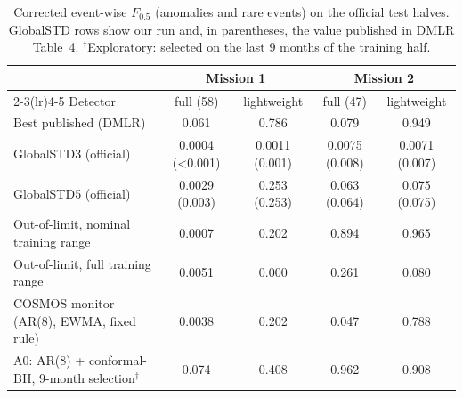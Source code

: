 \begin{table}[t]\centering\small
\caption{Corrected event-wise $F_{0.5}$ (anomalies and rare events) on the official test halves. GlobalSTD rows show our run and, in parentheses, the value published in DMLR Table~4. $^\dagger$Exploratory: selected on the last 9 months of the training half.}\label{tab:baselines}
\begin{tabular}{lcccc}\toprule
 & \multicolumn{2}{c}{Mission 1} & \multicolumn{2}{c}{Mission 2}\\
\cmidrule(lr){2-3}\cmidrule(lr){4-5}
Detector & full (58) & lightweight & full (47) & lightweight\\\midrule
Best published (DMLR) & 0.061 & 0.786 & 0.079 & 0.949\\
GlobalSTD3 (official) & 0.0004 (<0.001) & 0.0011 (0.001) & 0.0075 (0.008) & 0.0071 (0.007)\\
GlobalSTD5 (official) & 0.0029 (0.003) & 0.253 (0.253) & 0.063 (0.064) & 0.075 (0.075)\\
Out-of-limit, nominal training range & 0.0007 & 0.202 & 0.894 & 0.965\\
Out-of-limit, full training range & 0.0051 & 0.000 & 0.261 & 0.080\\
COSMOS monitor (AR(8), EWMA, fixed rule) & 0.0038 & 0.202 & 0.047 & 0.788\\
A0: AR(8) + conformal-BH, 9-month selection$^\dagger$ & 0.074 & 0.408 & 0.962 & 0.908\\
\bottomrule\end{tabular}\end{table}
